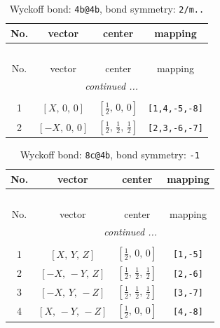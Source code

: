\documentclass[fleqn,8pt]{jsarticle}
\begin{document}
\renewcommand{\arraystretch}{1.2}
\begin{longtable}{cccc}
\caption{Wyckoff bond: {\tt 4b@4b}, bond symmetry: {\tt 2/m..}}
 \\
 \hline \hline
No. & vector & center & mapping \\ \hline \endfirsthead

\multicolumn{3}{l}{\tablename\ \thetable{}} \\
 \hline \hline
No. & vector & center & mapping \\ \hline \endhead

 \hline \hline
\multicolumn{3}{r}{\footnotesize\it continued ...} \\ \endfoot

 \hline \hline
\multicolumn{3}{r}{} \\ \endlastfoot

1 & $\left[ X,\, 0,\, 0 \right]$ & $\left[ \frac{1}{2},\, 0,\, 0 \right]$ & {\tt [1,4,-5,-8]} \\ \hline
2 & $\left[ - X,\, 0,\, 0 \right]$ & $\left[ \frac{1}{2},\, \frac{1}{2},\, \frac{1}{2} \right]$ & {\tt [2,3,-6,-7]} \\
\end{longtable}
\renewcommand{\arraystretch}{1.2}
\begin{longtable}{cccc}
\caption{Wyckoff bond: {\tt 8c@4b}, bond symmetry: {\tt -1}}
 \\
 \hline \hline
No. & vector & center & mapping \\ \hline \endfirsthead

\multicolumn{3}{l}{\tablename\ \thetable{}} \\
 \hline \hline
No. & vector & center & mapping \\ \hline \endhead

 \hline \hline
\multicolumn{3}{r}{\footnotesize\it continued ...} \\ \endfoot

 \hline \hline
\multicolumn{3}{r}{} \\ \endlastfoot

1 & $\left[ X,\, Y,\, Z \right]$ & $\left[ \frac{1}{2},\, 0,\, 0 \right]$ & {\tt [1,-5]} \\ \hline
2 & $\left[ - X,\, - Y,\, Z \right]$ & $\left[ \frac{1}{2},\, \frac{1}{2},\, \frac{1}{2} \right]$ & {\tt [2,-6]} \\ \hline
3 & $\left[ - X,\, Y,\, - Z \right]$ & $\left[ \frac{1}{2},\, \frac{1}{2},\, \frac{1}{2} \right]$ & {\tt [3,-7]} \\ \hline
4 & $\left[ X,\, - Y,\, - Z \right]$ & $\left[ \frac{1}{2},\, 0,\, 0 \right]$ & {\tt [4,-8]} \\
\end{longtable}
\end{document}
